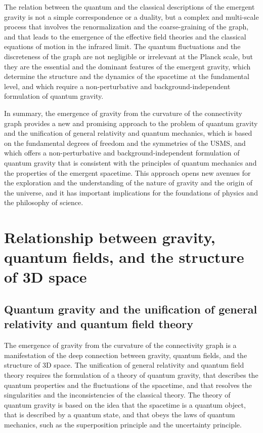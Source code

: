 \begin{tcolorbox}[colback=green!5!white,colframe=green!75!black,title=Question]
The relation between the quantum and the classical descriptions of the emergent gravity is not a simple correspondence or a duality, but a complex and multi-scale process that involves the renormalization and the coarse-graining of the graph, and that leads to the emergence of the effective field theories and the classical equations of motion in the infrared limit. The quantum fluctuations and the discreteness of the graph are not negligible or irrelevant at the Planck scale, but they are the essential and the dominant features of the emergent gravity, which determine the structure and the dynamics of the spacetime at the fundamental level, and which require a non-perturbative and background-independent formulation of quantum gravity.

In summary, the emergence of gravity from the curvature of the connectivity graph provides a new and promising approach to the problem of quantum gravity and the unification of general relativity and quantum mechanics, which is based on the fundamental degrees of freedom and the symmetries of the USMS, and which offers a non-perturbative and background-independent formulation of quantum gravity that is consistent with the principles of quantum mechanics and the properties of the emergent spacetime. This approach opens new avenues for the exploration and the understanding of the nature of gravity and the origin of the universe, and it has important implications for the foundations of physics and the philosophy of science.
\end{tcolorbox}

\section{Relationship between gravity, quantum fields, and the structure of 3D space}
\subsection{Quantum gravity and the unification of general relativity and quantum field theory}
The emergence of gravity from the curvature of the connectivity graph is a manifestation of the deep connection between gravity, quantum fields, and the structure of 3D space. The unification of general relativity and quantum field theory requires the formulation of a theory of quantum gravity, that describes the quantum properties and the fluctuations of the spacetime, and that resolves the singularities and the inconsistencies of the classical theory. The theory of quantum gravity is based on the idea that the spacetime is a quantum object, that is described by a quantum state, and that obeys the laws of quantum mechanics, such as the superposition principle and the uncertainty principle.

